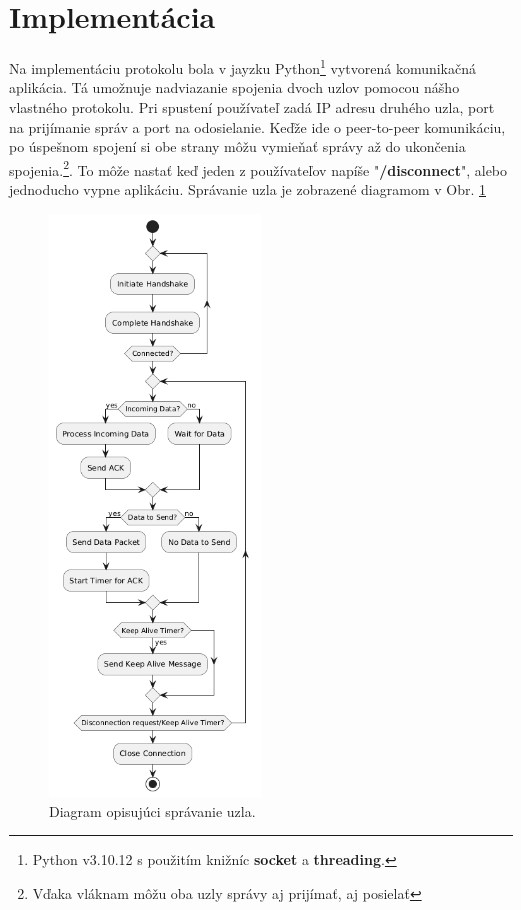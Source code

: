 \documentclass[a4paper,12pt]{article}
\begin{document}
\section{Implementácia}
    Na implementáciu protokolu bola v jayzku Python\footnote{Python v3.10.12 s použitím knižníc \textbf{socket} a \textbf{threading}.} vytvorená komunikačná aplikácia. Tá umožnuje nadviazanie spojenia dvoch uzlov pomocou nášho vlastného protokolu. Pri spustení používateľ zadá IP adresu druhého uzla, port na prijímanie správ a port na odosielanie. Keďže ide o peer-to-peer komunikáciu, po úspešnom spojení si obe strany môžu vymieňať správy až do ukončenia spojenia.\footnote{Vďaka vláknam môžu oba uzly správy aj prijímať, aj posielať}. To môže nastať keď jeden z používateľov napíše "\textbf{/disconnect}", alebo jednoducho vypne aplikáciu. Správanie uzla je zobrazené diagramom v Obr. \ref{fig:workflow}

   \begin{figure}[h]
        \centering
        \includegraphics[width=0.5\textwidth]{program_diagram.png}
        \caption{Diagram opisujúci správanie uzla.}
        \label{fig:workflow}
    \end{figure}
\end{document}
